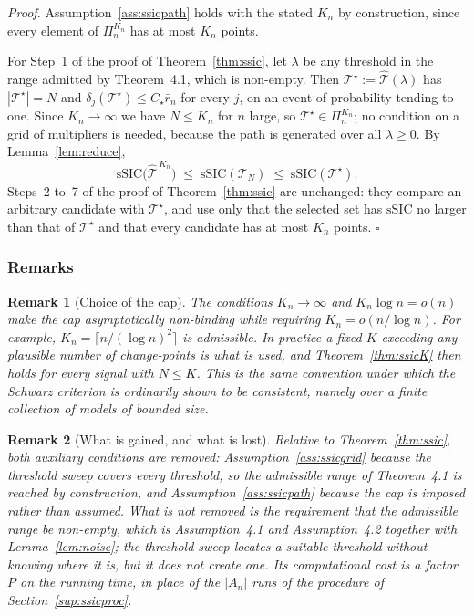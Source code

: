 \documentclass[12pt, a4paper]{article}
\newcommand{\qed}{\hfill$\square$}
\newenvironment{proof}[1][Proof]{\par\noindent\textit{#1.}\space}{\qed\par\medskip}
\newtheorem{remark}{Remark}[section]
\newcommand{\mainthm}{Theorem~4.1}
\newcommand{\assterm}{Assumption~4.1}
\newcommand{\assnondeg}{Assumption~4.2}
\begin{document}
\begin{proof}
Assumption~\ref{ass:ssicpath} holds with the stated $K_n$ by construction,
since every element of $\Pi_n^{K_n}$ has at most $K_n$ points.

For Step~1 of the proof of Theorem~\ref{thm:ssic}, let $\lambda$ be any
threshold in the range admitted by \mainthm{}, which is non-empty. Then
$\mathcal{T}^\star := \hat{\mathcal{T}}(\lambda)$ has $|\mathcal{T}^\star| = N$
and $\delta_j(\mathcal{T}^\star) \le C_\star\bar r_n$ for every $j$, on an
event of probability tending to one. Since $K_n \to \infty$ we have
$N \le K_n$ for $n$ large, so $\mathcal{T}^\star \in \Pi_n^{K_n}$; no condition
on a grid of multipliers is needed, because the path is generated over all
$\lambda \ge 0$. By Lemma~\ref{lem:reduce},
\[
\mathrm{sSIC}\big( \hat{\mathcal{T}}^{\,K_n} \big) \;\le\;
\mathrm{sSIC}(\mathcal{T}_N) \;\le\; \mathrm{sSIC}(\mathcal{T}^\star) .
\]
Steps~2 to~7 of the proof of Theorem~\ref{thm:ssic} are unchanged: they compare
an arbitrary candidate with $\mathcal{T}^\star$, and use only that the selected
set has $\mathrm{sSIC}$ no larger than that of $\mathcal{T}^\star$ and that
every candidate has at most $K_n$ points.
\end{proof}

\subsubsection*{Remarks}

\begin{remark}[Choice of the cap]
\label{rem:capchoice}
The conditions $K_n\to\infty$ and $K_n\log n=o(n)$ make the cap
asymptotically non-binding while requiring $K_n=o(n/\log n)$. For example,
$K_n=\lceil n/(\log n)^2\rceil$ is admissible. In practice a fixed
$K$ exceeding any plausible number of change-points is what is used, and
Theorem~\ref{thm:ssicK} then holds for every signal with $N \le K$. This is the
same convention under which the Schwarz criterion is ordinarily shown to be
consistent, namely over a finite collection of models of bounded size.
\end{remark}

\begin{remark}[What is gained, and what is lost]
\label{rem:sizegain}
Relative to Theorem~\ref{thm:ssic}, both auxiliary conditions are removed:
Assumption~\ref{ass:ssicgrid} because the threshold sweep covers every
threshold, so the admissible range of \mainthm{} is reached by construction,
and
Assumption~\ref{ass:ssicpath} because the cap is imposed rather than assumed.
What is not removed is the requirement that the admissible range be non-empty,
which is \assterm{} and \assnondeg{} together with
Lemma~\ref{lem:noise}; the threshold sweep locates a suitable threshold
without knowing where it is, but it does not create one. Its computational
cost is a factor $P$ on the running time, in place of the $|A_n|$ runs of the
procedure of
Section~\ref{sup:ssicproc}.
\end{remark}
\end{document}
